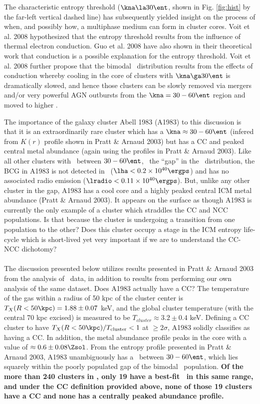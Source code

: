 \documentclass[letterpaper,11pt,twocolumn]{article}
\begin{document}
The characteristic entropy threshold ($\kna \la 30 \ent$, shown in
Fig. \ref{fig:hist} by the far-left vertical dashed line) has
subsequently yielded insight on the process of when, and possibly how,
a multiphase medium can form in cluster cores.  Voit et al. 2008
hypothesized that the entropy threshold results from the influence of
thermal electron conduction. Guo et al. 2008 have also shown in their
theoretical work that conduction is a possible explanation for the
entropy threshold. Voit et al. 2008 further propose that the bimodal
\kna\ distribution results from the effects of conduction whereby
cooling in the core of clusters with $\kna \ga 30 \ent$ is
dramatically slowed, and hence those clusters can be slowly removed
via mergers and/or very powerful AGN outbursts from the $\kna=30-60
\ent$ region and moved to higher \kna.

The importance of the galaxy cluster Abell 1983 (A1983) to this
discussion is that it is an extraordinarily rare cluster which has a
$\kna \approx 30-60 \ent$ (infered from $K(r)$ profile shown in Pratt
\& Arnaud 2003) but has a CC and peaked central metal abundance (again
using the profiles in Pratt \& Arnaud 2003). Like all other clusters
with \kna\ between $30-60 \ent$, \eg\ the ``gap'' in the
\kna\ distribution, the BCG in A1983 is not detected in
\halpha\ ($\lha < 0.2\times10^{40} \ergps$) and has no associated
radio emission ($\lradio < 0.11\times10^{40} \ergps$). But, unlike any
other cluster in the gap, A1983 has a cool core and a highly peaked
central ICM metal abundance (Pratt \& Arnaud 2003). It appears on the
surface as though A1983 is currently the only example of a cluster
which straddles the CC and NCC populations. Is that because the
cluster is undergoing a transition from one population to the other?
Does this cluster occupy a stage in the ICM entropy life-cycle which
is short-lived yet very important if we are to understand the CC-NCC
dichotomy?\\

\\
The discussion presented below utilizes results presented in Pratt \&
Arnaud 2003 from the analysis of \xmm\ data, in addition to results
from performing our own analysis of the same dataset. Does A1983
actually have a CC? The temperature of the gas within a radius of 50
kpc of the cluster center is $T_X(R < 50\kpc) = 1.88 \pm 0.07$ keV,
and the global cluster temperature (with the central 70 kpc excised)
is measured to be $T_{cluster} \approx 3.2 \pm 0.4$ keV. Defining a CC
cluster to have $T_X(R < 50\kpc) / T_{\mathrm{cluster}} < 1$ at $\ge
2\sigma$, A1983 solidly classifies as having a CC. In addition, the
metal abundance profile peaks in the core with a value of $\approx 0.6
\pm 0.08 \Zsol$. From the entropy profile presented in Pratt \& Arnaud
2003, A1983 unambiguously has a \kna\ between $30-60 \ent$, which lies
squarely within the poorly populated gap of the bimodal
\kna\ population. {\bf{Of the more than 240 clusters in \accept, only
    19 have a best-fit \kna\ in this same range, and under the CC
    definition provided above, none of those 19 clusters have a CC and
    none has a centrally peaked abundance profile.}}
\end{document}
